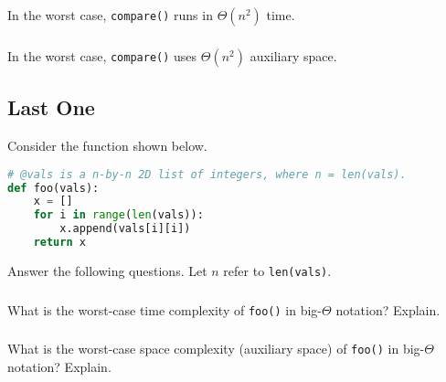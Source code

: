\documentclass{article}
\begin{document}
In the worst case, \lstinline{compare()} runs in $\Theta(n^2)$ time.

\begin{mdframed}
\vspace{3em}
\end{mdframed}

\subsubsection{}

In the worst case, \lstinline{compare()} uses $\Theta(n^2)$ auxiliary space.

\begin{mdframed}
\vspace{3em}
\end{mdframed}

\subsection{Last One}

Consider the function shown below.

\begin{lstlisting}[language=Python]
# @vals is a n-by-n 2D list of integers, where n = len(vals).
def foo(vals):
    x = []
    for i in range(len(vals)):
        x.append(vals[i][i])
    return x
\end{lstlisting}

Answer the following questions. Let $n$ refer to \lstinline{len(vals)}.

\subsubsection{}

What is the worst-case time complexity of \lstinline{foo()} in big-$\Theta$ notation? Explain.

\begin{mdframed}
\vspace{3em}
\end{mdframed}

\subsubsection{}

What is the worst-case space complexity (auxiliary space) of \lstinline{foo()} in big-$\Theta$ notation? Explain.

\begin{mdframed}
\vspace{3em}
\end{mdframed}

\end{document}
